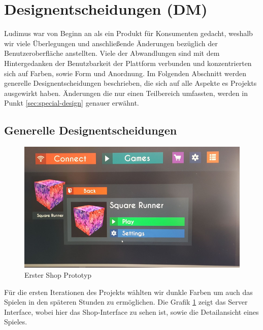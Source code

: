 \section{Designentscheidungen (DM)}
Ludimus war von Beginn an als ein Produkt für Konsumenten gedacht, weshalb wir viele Überlegungen und anschließende Änderungen bezüglich der Benutzeroberfläche anstellten. Viele der Abwandlungen sind mit dem Hintergedanken der Benutzbarkeit der Plattform verbunden und konzentrierten sich auf Farben, sowie Form und Anordnung. Im Folgenden Abschnitt werden generelle Designentscheidungen beschrieben, die sich auf alle Aspekte es Projekts ausgewirkt haben. Änderungen die nur einen Teilbereich umfassten, werden in Punkt \ref{sec:special-design} genauer erwähnt.
\subsection{Generelle Designentscheidungen}
\begin{center}
    \begin{figure}
        \includegraphics[scale=0.7]{images/design01.png} 
        \caption{Erster Shop Prototyp}
        \label{img:design01}
    \end{figure}
\end{center}
Für die ersten Iterationen des Projekts wählten wir dunkle Farben um auch das Spielen in den späteren Stunden zu ermöglichen. Die Grafik \ref{img:design01} zeigt das Server Interface, wobei hier das Shop-Interface zu sehen ist, sowie die Detailansicht eines Spieles. 
\newline
